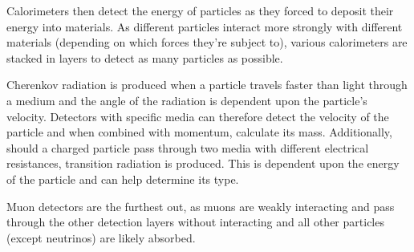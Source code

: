  Calorimeters then detect the energy of particles as they forced to deposit their energy into materials. As different particles interact more strongly with different materials (depending on which forces they're subject to), various calorimeters are stacked in layers to detect as many particles as possible.
 
Cherenkov radiation is produced when a particle travels faster than light through a medium and the angle of the radiation is dependent upon the particle's velocity. Detectors with specific media can therefore detect the velocity of the particle and when combined with momentum, calculate its mass. \cite{CERN:Detectors} Additionally, should a charged particle pass through two media with different electrical resistances, transition radiation is produced. This is dependent upon the energy of the particle and can help determine its type.
 
 Muon detectors are the furthest out, as muons are weakly interacting and pass through the other detection layers without interacting and all other particles (except neutrinos) are likely absorbed.
 
 \cite{Uni:NuclearNotes} 
